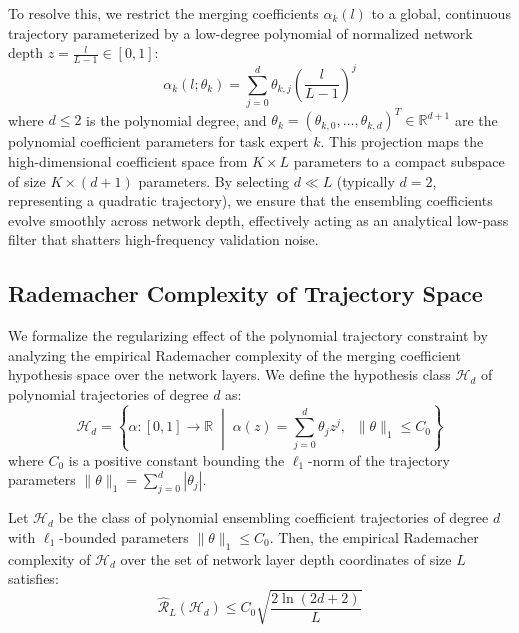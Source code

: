 To resolve this, we restrict the merging coefficients $\alpha_k(l)$ to a global, continuous trajectory parameterized by a low-degree polynomial of normalized network depth $z = \frac{l}{L-1} \in [0, 1]$:
\begin{equation}
\alpha_k(l; \theta_k) = \sum_{j=0}^d \theta_{k,j} \left(\frac{l}{L-1}\right)^j
\end{equation}
where $d \le 2$ is the polynomial degree, and $\theta_k = (\theta_{k,0}, \dots, \theta_{k,d})^T \in \mathbb{R}^{d+1}$ are the polynomial coefficient parameters for task expert $k$. This projection maps the high-dimensional coefficient space from $K \times L$ parameters to a compact subspace of size $K \times (d+1)$ parameters. By selecting $d \ll L$ (typically $d = 2$, representing a quadratic trajectory), we ensure that the ensembling coefficients evolve smoothly across network depth, effectively acting as an analytical low-pass filter that shatters high-frequency validation noise.

\subsection{Rademacher Complexity of Trajectory Space}
We formalize the regularizing effect of the polynomial trajectory constraint by analyzing the empirical Rademacher complexity of the merging coefficient hypothesis space over the network layers. We define the hypothesis class $\mathcal{H}_d$ of polynomial trajectories of degree $d$ as:
\begin{equation}
\mathcal{H}_d = \left\{ \alpha: [0, 1] \to \mathbb{R} \;\middle|\; \alpha(z) = \sum_{j=0}^d \theta_j z^j, \;\; \|\theta\|_1 \le C_0 \right\}
\end{equation}
where $C_0$ is a positive constant bounding the $\ell_1$-norm of the trajectory parameters $\|\theta\|_1 = \sum_{j=0}^d |\theta_j|$.

\begin{theorem}
\label{thm:rademacher_bound}
Let $\mathcal{H}_d$ be the class of polynomial ensembling coefficient trajectories of degree $d$ with $\ell_1$-bounded parameters $\|\theta\|_1 \le C_0$. Then, the empirical Rademacher complexity of $\mathcal{H}_d$ over the set of network layer depth coordinates of size $L$ satisfies:
\begin{equation}
\label{eq:rademacher_bound_trajectory}
\widehat{\mathcal{R}}_L(\mathcal{H}_d) \le C_0 \sqrt{\frac{2 \ln(2 d + 2)}{L}}
\end{equation}
\end{theorem}

